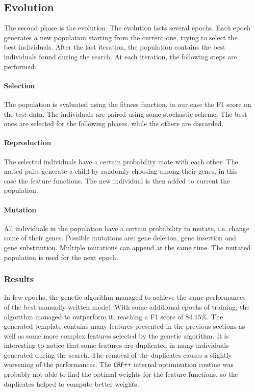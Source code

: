 \subsection{Evolution}
The second phase is the evolution.
The evolution lasts several epochs.
Each epoch generates a new population starting from the current one, trying to select the best individuals.
After the last iteration, the population contains the best individuals found during the search.
At each iteration, the following steps are performed.

\paragraph{Selection}
The population is evaluated using the fitness function, in our case the F1 score on the test data.
The individuals are paired using some stochastic scheme.
The best ones are selected for the following phases, while the others are discarded.

\paragraph{Reproduction}
The selected individuals have a certain probability mate with each other.
The mated pairs generate a child by randomly choosing among their genes, in this case the feature functions.
The new individual is then added to current the population.

\paragraph{Mutation}
All individuals in the population have a certain probability to mutate, i.e. change some of their genes.
Possible mutations are: gene deletion, gene insertion and gene substitution.
Multiple mutations can append at the same time.
The mutated population is used for the next epoch.

\subsubsection{Results}
In few epochs, the genetic algorithm managed to achieve the same performances of the best manually written model.
With some additional epochs of training, the algorithm managed to outperform it, reaching a F1 score of $84.15\%$.
The generated template contains many features presented in the previous sections as well as some more complex features selected by the genetic algorithm.
It is interesting to notice that some features are duplicated in many individuals generated during the search.
The removal of the duplicates causes a slightly worsening of the performances.
The \texttt{CRF++} internal optimization routine was probably not able to find the optimal weights for the feature functions, so the duplicates helped to compute better weights.


